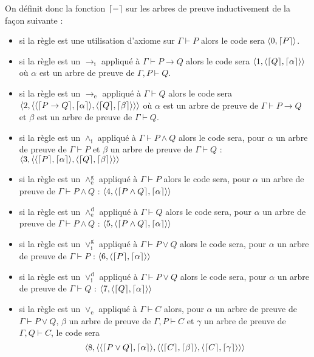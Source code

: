 \begin{defi}
    On définit donc la fonction $\lceil - \rceil$ sur les arbres de preuve inductivement de la façon suivante :
    \begin{itemize}[label=$\bullet$]
        \item si la règle est une utilisation d'axiome sur $\Gamma\vdash P$ alors le code sera $\langle 0,\lceil P \rceil\rangle$.
        \item si la règle est un $\to_\mathrm i$ appliqué à $\Gamma\vdash P\to Q$ alors le code sera $\langle 1,\langle \lceil Q \rceil,\lceil \alpha \rceil\rangle\rangle$ où $\alpha$ est un arbre de preuve de $\Gamma,P\vdash Q$.
        \item si la règle est un $\to_\mathrm e$ appliqué à $\Gamma\vdash Q$ alors le code sera $\langle 2,\langle\langle\lceil P\to Q \rceil,\lceil \alpha \rceil\rangle,\langle \lceil Q \rceil,\lceil \beta \rceil\rangle\rangle\rangle$ où $\alpha$ est un arbre de preuve de $\Gamma\vdash P \to Q$ et $\beta$ est un arbre de preuve de $\Gamma\vdash Q$.
        \item si la règle est un $\land_\mathrm i$ appliqué à $\Gamma\vdash P\land Q$ alors le code sera, pour $\alpha$ un arbre de preuve de $\Gamma\vdash P$ et $\beta$ un arbre de preuve de $\Gamma\vdash Q$ : $\langle 3,\langle \langle \lceil P \rceil,\lceil \alpha \rceil \rangle,\langle\lceil Q \rceil,\lceil \beta \rceil\rangle \rangle\rangle$
        \item si la règle est un $\land_\mathrm e^\mathrm g$ appliqué à $\Gamma\vdash P$ alors le code sera, pour $\alpha$ un arbre de preuve de $\Gamma\vdash P\land Q$ : $\langle 4,\langle \lceil P\land Q \rceil,\lceil \alpha \rceil\rangle\rangle$
        \item si la règle est un $\land_\mathrm e^\mathrm d$ appliqué à $\Gamma\vdash Q$ alors le code sera, pour $\alpha$ un arbre de preuve de $\Gamma\vdash P\land Q$ : $\langle 5,\langle \lceil P\land Q \rceil,\lceil \alpha \rceil\rangle\rangle$
        \item si la règle est un $\lor_\mathrm i^\mathrm g$ appliqué à $\Gamma\vdash P\lor Q$ alors le code sera, pour $\alpha$ un arbre de preuve de $\Gamma\vdash P$ : $\langle 6,\langle \lceil P \rceil,\lceil \alpha \rceil\rangle\rangle$
        \item si la règle est un $\lor_\mathrm i^\mathrm d$ appliqué à $\Gamma\vdash P\lor Q$ alors le code sera, pour $\alpha$ un arbre de preuve de $\Gamma\vdash Q$ : $\langle 7,\langle \lceil Q \rceil,\lceil \alpha \rceil\rangle\rangle$
        \item si la règle est un $\lor_\mathrm e$ appliqué à $\Gamma\vdash C$ alors, pour $\alpha$ un arbre de preuve de $\Gamma\vdash P\lor Q$, $\beta$ un arbre de preuve de $\Gamma,P\vdash C$ et $\gamma$ un arbre de preuve de $\Gamma,Q\vdash C$, le code sera $$\langle 8,\langle \langle \lceil P\lor Q \rceil,\lceil \alpha \rceil \rangle,\langle \langle \lceil C \rceil,\lceil \beta \rceil\rangle,\langle\lceil C \rceil,\lceil \gamma \rceil\rangle  \rangle\rangle$$

\end{itemize}
\end{defi}
